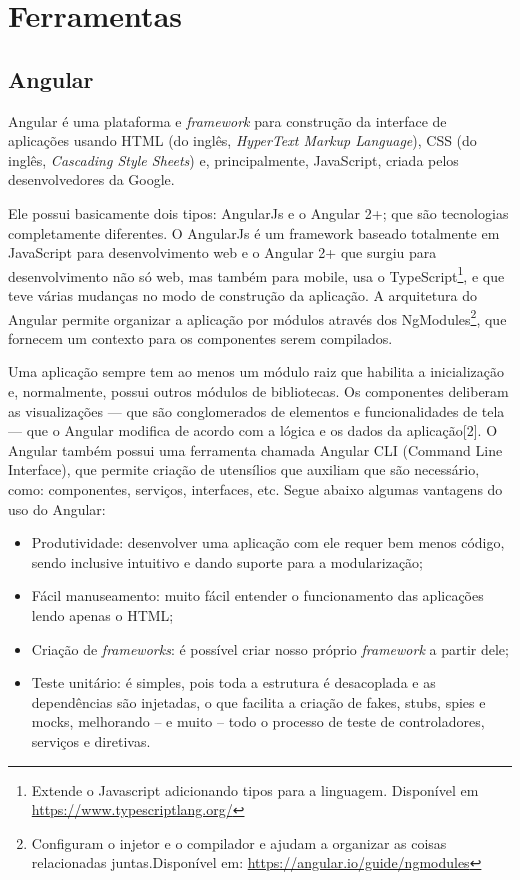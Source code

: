 \section{Ferramentas}

\subsection{Angular}
Angular \cite{afonso2018angular} é uma plataforma e \textit{framework} para construção da interface de aplicações usando HTML (do inglês, \textit{HyperText Markup Language}), CSS (do inglês, \textit{Cascading Style Sheets}) e, principalmente, JavaScript, criada pelos desenvolvedores da Google. 

Ele possui basicamente dois tipos: AngularJs e o Angular 2+; que são tecnologias completamente diferentes. O AngularJs é um framework baseado totalmente em JavaScript para desenvolvimento web e o Angular 2+ que surgiu para desenvolvimento não só web, mas também para mobile, usa o TypeScript\footnote{Extende o Javascript adicionando tipos para a linguagem. Disponível em \url{https://www.typescriptlang.org/}}, e que teve várias mudanças no modo de construção da aplicação. A arquitetura do Angular permite organizar a aplicação por módulos através dos NgModules\footnote{Configuram o injetor e o compilador e ajudam a organizar as coisas relacionadas juntas.Disponível em: \url{https://angular.io/guide/ngmodules}}, que fornecem um contexto para os componentes serem compilados. 

Uma aplicação sempre tem ao menos um módulo raiz que habilita a inicialização e, normalmente, possui outros módulos de bibliotecas. Os componentes deliberam as visualizações — que são conglomerados de elementos e funcionalidades de tela — que o Angular modifica de acordo com a lógica e os dados da aplicação[2]. O Angular também possui uma ferramenta chamada Angular CLI (Command Line Interface), que permite criação de utensílios que auxiliam que são necessário, como: componentes, serviços, interfaces, etc. Segue abaixo algumas vantagens do uso do Angular:  

\begin{itemize}
    \item Produtividade: desenvolver uma aplicação com ele requer bem menos código, sendo inclusive intuitivo e dando suporte para a modularização; 
    \item Fácil manuseamento: muito fácil entender o funcionamento das aplicações lendo apenas o HTML;   
    \item Criação de \textit{frameworks}: é possível criar nosso próprio \textit{framework} a partir dele;   
    \item Teste unitário: é simples, pois toda a estrutura é desacoplada e as dependências são injetadas, o que facilita a criação de fakes, stubs, spies e mocks, melhorando – e muito – todo o processo de teste de controladores, serviços e diretivas. 
\end{itemize}

